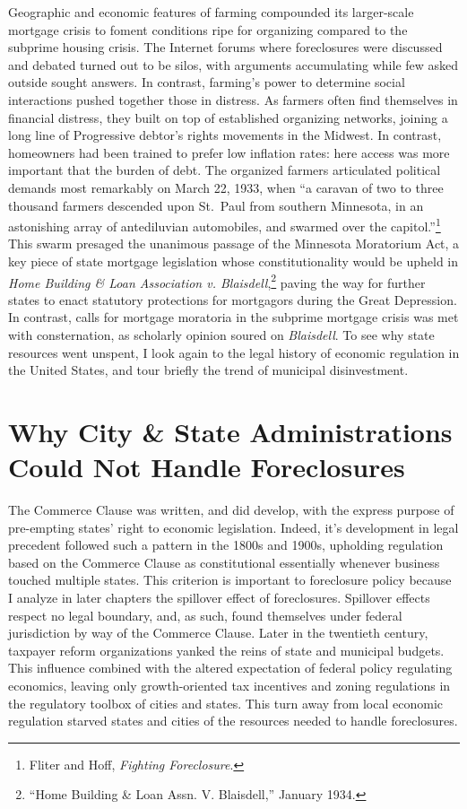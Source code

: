 \documentclass[12pt,oneside]{psthesis}
\begin{document}
Geographic and economic features of farming compounded its larger-scale mortgage crisis to foment conditions ripe for organizing compared to the subprime housing crisis.
The Internet forums where foreclosures were discussed and debated turned out to be silos, with arguments accumulating while few asked outside sought answers.
In contrast, farming's power to determine social interactions pushed together those in distress.
As farmers often find themselves in financial distress, they built on top of established organizing networks, joining a long line of Progressive debtor's rights movements in the Midwest.
In contrast, homeowners had been trained to prefer low inflation rates: here access was more important that the burden of debt.
The organized farmers articulated political demands most remarkably on March 22, 1933, when ``a caravan of two to three thousand farmers descended upon St.~Paul from southern Minnesota, in an astonishing array of antediluvian automobiles, and swarmed over the capitol.''\footnote{Fliter and Hoff, \emph{Fighting Foreclosure}.}
This swarm presaged the unanimous passage of the Minnesota Moratorium Act, a key piece of state mortgage legislation whose constitutionality would be upheld in \emph{Home Building \& Loan Association v. Blaisdell},\footnote{``Home Building \& Loan Assn. V. Blaisdell,'' January 1934.} paving the way for further states to enact statutory protections for mortgagors during the Great Depression.
In contrast, calls for mortgage moratoria in the subprime mortgage crisis was met with consternation, as scholarly opinion soured on \emph{Blaisdell}.
To see why state resources went unspent, I look again to the legal history of economic regulation in the United States, and tour briefly the trend of municipal disinvestment.

\hypertarget{cities-states}{%
\section{Why City \& State Administrations Could Not Handle Foreclosures}\label{cities-states}}

The Commerce Clause was written, and did develop, with the express purpose of pre-empting states' right to economic legislation.
Indeed, it's development in legal precedent followed such a pattern in the 1800s and 1900s, upholding regulation based on the Commerce Clause as constitutional essentially whenever business touched multiple states.
This criterion is important to foreclosure policy because I analyze in later chapters the spillover effect of foreclosures.
Spillover effects respect no legal boundary, and, as such, found themselves under federal jurisdiction by way of the Commerce Clause.
Later in the twentieth century, taxpayer reform organizations yanked the reins of state and municipal budgets.
This influence combined with the altered expectation of federal policy regulating economics, leaving only growth-oriented tax incentives and zoning regulations in the regulatory toolbox of cities and states.
This turn away from local economic regulation starved states and cities of the resources needed to handle foreclosures.
\end{document}
